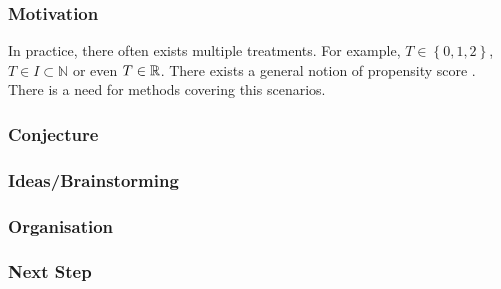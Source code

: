 \subsubsection{Motivation}
In practice, there often exists multiple treatments.
For example, $T\in \left\{
  0,1,2
\right\}$, $T\in I\subset \mathbb{N}$ or even $T\in\mathbb{R}$. 
There exists a general notion of propensity score \cite{Hirano2005}.
There is a need for methods covering this scenarios.
\subsubsection{Conjecture}
\subsubsection{Ideas/Brainstorming}
\subsubsection{Organisation}
\subsubsection{Next Step}
